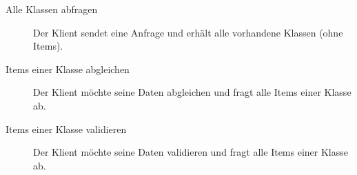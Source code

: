 \begin{description}
\item[Alle Klassen abfragen] Der Klient sendet eine Anfrage und erhält alle vorhandene Klassen (ohne Items).
\item[Items einer Klasse abgleichen] Der Klient möchte seine Daten abgleichen und fragt alle Items einer Klasse ab.  
\item[Items einer Klasse validieren] Der Klient möchte seine Daten validieren und fragt alle Items einer Klasse ab.
\end{description}
